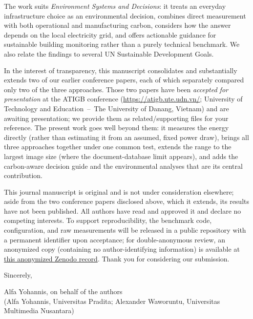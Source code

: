 \documentclass[11pt]{article}
\begin{document}
The work suits \emph{Environment Systems and Decisions}: it treats an everyday infrastructure
choice as an environmental decision, combines direct measurement with both operational and
manufacturing carbon, considers how the answer depends on the local electricity grid, and
offers actionable guidance for sustainable building monitoring rather than a purely technical
benchmark. We also relate the findings to several UN Sustainable Development Goals.

In the interest of transparency, this manuscript consolidates and substantially extends two of
our earlier conference papers, each of which separately compared only two of the three
approaches. Those two papers have been \emph{accepted for presentation} at the ATIGB conference
(\url{https://atigb.ute.udn.vn/}; University of Technology and Education~--~The University of
Danang, Vietnam) %
and are awaiting presentation; we provide them as related/supporting files for your reference.
The present work goes well beyond them: it measures the energy directly (rather than estimating
it from an assumed, fixed power draw), brings all three approaches together under one common
test, extends the range to the largest image size (where the document-database limit appears),
and adds the carbon-aware decision guide and the environmental analyses that are its central
contribution.

This journal manuscript is original and is not under consideration elsewhere; aside from the two
conference papers disclosed above, which it extends, its results have not been published. All
authors have read and approved it and declare no competing interests. To support
reproducibility, the benchmark code, configuration, and raw measurements will be released in a
public repository with a permanent identifier upon acceptance; for double-anonymous review, an
anonymized copy (containing no author-identifying information) is available at
\href{https://zenodo.org/records/20625061?preview=1&token=eyJhbGciOiJIUzUxMiJ9.eyJpZCI6IjE1ZDQyNzc4LTYxYTYtNDA0ZS1iMWIxLTVjOWQ1NGJmMjE2OSIsImRhdGEiOnt9LCJyYW5kb20iOiIxNDVkNjFjY2YyYzQ0MWJkYjlhOTFiODVhZWIzYjBjNCJ9.vP1B47u0fgzHZBwAfzy0vaCovVocEnyunccYdxbtm93wzaFI53PeTa-6z-Z7x9CQ43_AjJXBcsz4xJx1lfP3DQ}{this
anonymized Zenodo record}. Thank you for considering our
submission.

\vspace{0.6em}
\noindent Sincerely,

\vspace{1em}
\noindent Alfa Yohannis, on behalf of the authors\\
(Alfa Yohannis, Universitas Pradita; Alexander Waworuntu, Universitas Multimedia Nusantara)
\end{document}
